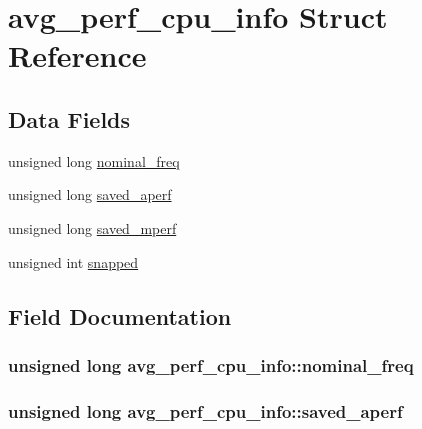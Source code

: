 \hypertarget{structavg__perf__cpu__info}{}\section{avg\+\_\+perf\+\_\+cpu\+\_\+info Struct Reference}
\label{structavg__perf__cpu__info}
\subsection*{Data Fields}
\begin{DoxyCompactItemize}
\item 
unsigned long \hyperlink{structavg__perf__cpu__info_aa0a87d5cf420e092ba9016f0e01262d7}{nominal\+\_\+freq}
\item 
unsigned long \hyperlink{structavg__perf__cpu__info_a6843458a338e4c03733b084169b2cd44}{saved\+\_\+aperf}
\item 
unsigned long \hyperlink{structavg__perf__cpu__info_a8f70a19a5bd1ce32bd2f88f82e443fea}{saved\+\_\+mperf}
\item 
unsigned int \hyperlink{structavg__perf__cpu__info_a839deb12ce46ffbee042a7bc33f9d1e1}{snapped}
\end{DoxyCompactItemize}


\subsection{Field Documentation}
\subsubsection[{\texorpdfstring{nominal\+\_\+freq}{nominal_freq}}]{\setlength{\rightskip}{0pt plus 5cm}unsigned long avg\+\_\+perf\+\_\+cpu\+\_\+info\+::nominal\+\_\+freq}\hypertarget{structavg__perf__cpu__info_aa0a87d5cf420e092ba9016f0e01262d7}{}\label{structavg__perf__cpu__info_aa0a87d5cf420e092ba9016f0e01262d7}
\subsubsection[{\texorpdfstring{saved\+\_\+aperf}{saved_aperf}}]{\setlength{\rightskip}{0pt plus 5cm}unsigned long avg\+\_\+perf\+\_\+cpu\+\_\+info\+::saved\+\_\+aperf}\hypertarget{structavg__perf__cpu__info_a6843458a338e4c03733b084169b2cd44}{}\label{structavg__perf__cpu__info_a6843458a338e4c03733b084169b2cd44}
